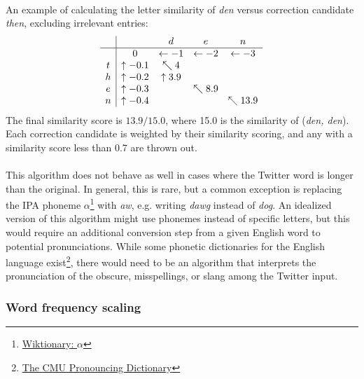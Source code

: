 \documentclass[twocolumn,10pt]{article}
\begin{document}
\paragraph{} An example of calculating the letter similarity of \textit{den} versus correction candidate \textit{then}, excluding irrelevant entries:
$$\begin{array} {c|cccc}
& & d & e & n \\ \hline
& 0 &\leftarrow -1 & \leftarrow -2 &  \leftarrow -3\\
t & \uparrow -0.1 & \nwarrow 4 & & \\
h & \uparrow -0.2 & \uparrow 3.9 & & \\
e & \uparrow -0.3& & \nwarrow 8.9 & \\
n & \uparrow -0.4 & & & \nwarrow 13.9 \\
\end{array}$$
The final similarity score is $13.9 / 15.0$, where 15.0 is the similarity of (\textit{den, den}). Each correction candidate is weighted by their similarity scoring, and any with a similarity score less than 0.7 are thrown out. 
\paragraph{} This algorithm does not behave as well in cases where the Twitter word is longer than the original. In general, this is rare, but a common exception is replacing the IPA phoneme $\alpha$\footnote{\href{http://en.wiktionary.org/wiki/\%C9\%91}{Wiktionary: $\alpha$}} with \textit{aw}, e.g. writing \textit{dawg} instead of \textit{dog}. An idealized version of this algorithm might use phonemes instead of specific letters, but this would require an additional conversion step from a given English word to potential pronunciations. While some phonetic dictionaries for the English language exist\footnote{\href{http://www.speech.cs.cmu.edu/cgi-bin/cmudict}{The CMU Pronouncing Dictionary}}, there would need to be an algorithm that interprets the pronunciation of the obscure, misspellings, or slang among the Twitter input.
\subsubsection*{Word frequency scaling}
\end{document}

